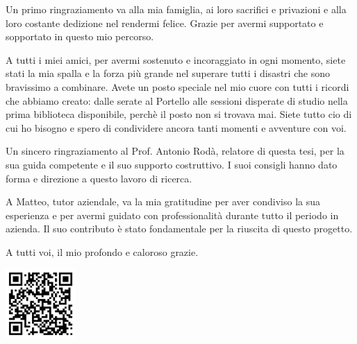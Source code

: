 
%

\begin{ntacknowledgements}

    
    Un primo ringraziamento va alla mia famiglia, ai loro sacrifici e privazioni e alla loro costante dedizione nel rendermi felice. Grazie per avermi supportato e sopportato in questo mio percorso.

    A tutti i miei amici, per avermi sostenuto e incoraggiato in ogni momento, siete stati la mia spalla e la forza più grande nel superare tutti i disastri che sono bravissimo a combinare.  Avete un posto speciale nel mio cuore con tutti i ricordi che abbiamo creato: dalle serate al Portello alle sessioni disperate di studio nella prima biblioteca disponibile, perchè il posto non si trovava mai. Siete tutto cio di cui ho bisogno e spero di condividere ancora tanti momenti e avventure con voi.

    Un sincero ringraziamento al Prof. Antonio Rodà, relatore di questa tesi, per la sua guida competente e il suo supporto costruttivo. I suoi consigli hanno dato forma e direzione a questo lavoro di ricerca.

    A Matteo, tutor aziendale, va la mia gratitudine per aver condiviso la sua esperienza e per avermi guidato con professionalità durante tutto il periodo in azienda. Il suo contributo è stato fondamentale per la riuscita di questo progetto.

    \vspace{2em}
    
    A tutti voi, il mio profondo e caloroso grazie.


\end{ntacknowledgements}

\vspace{2em}
\begin{center}
    \includegraphics[width=0.2\textwidth]{Chapters/Figures/thank_me.png} 
\end{center}